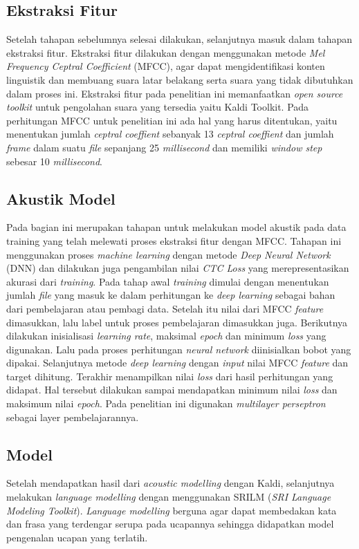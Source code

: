 \subsection{Ekstraksi Fitur}
Setelah tahapan sebelumnya selesai dilakukan, selanjutnya masuk dalam tahapan ekstraksi fitur. Ekstraksi fitur dilakukan dengan menggunakan metode \textit{Mel Frequency Ceptral Coefficient} (MFCC), agar dapat mengidentifikasi konten linguistik dan membuang suara latar belakang serta suara yang tidak dibutuhkan dalam proses ini. Ekstraksi fitur pada penelitian ini memanfaatkan \textit{open source toolkit} untuk pengolahan suara yang tersedia yaitu Kaldi Toolkit. Pada perhitungan MFCC untuk penelitian ini ada hal yang harus ditentukan, yaitu menentukan jumlah \textit{ceptral coeffient} sebanyak 13 \textit{ceptral coeffient} dan jumlah \textit{frame} dalam suatu \textit{file} sepanjang 25 \textit{millisecond} dan memiliki \textit{window step} sebesar 10 \textit{millisecond}.

\subsection{Akustik Model}
Pada bagian ini merupakan tahapan untuk melakukan model akustik pada data training yang telah melewati proses ekstraksi fitur dengan MFCC. Tahapan ini menggunakan proses \textit{machine learning} dengan metode \textit{Deep Neural Network} (DNN) dan dilakukan juga pengambilan nilai \textit{CTC Loss} yang merepresentasikan akurasi dari \textit{training}. Pada tahap awal \textit{training} dimulai dengan menentukan jumlah \textit{file} yang masuk ke dalam perhitungan ke \textit{deep learning} sebagai bahan dari pembelajaran atau pembagi data. Setelah itu nilai dari MFCC \textit{feature} dimasukkan, lalu label untuk proses pembelajaran dimasukkan juga. Berikutnya dilakukan inisialisasi \textit{learning rate}, maksimal \textit{epoch} dan minimum \textit{loss} yang digunakan. Lalu pada proses perhitungan \textit{neural network} diinisialkan bobot yang dipakai. Selanjutnya metode \textit{deep learning} dengan \textit{input} nilai MFCC \textit{feature} dan target dihitung. Terakhir menampilkan nilai \textit{loss} dari hasil perhitungan yang didapat. Hal tersebut dilakukan sampai mendapatkan minimum nilai \textit{loss} dan maksimum nilai \textit{epoch}. Pada penelitian ini digunakan \textit{multilayer perseptron} sebagai layer pembelajarannya. 

\subsection{Model}
Setelah mendapatkan hasil dari \textit{acoustic modelling} dengan Kaldi, selanjutnya melakukan \textit{language modelling} dengan menggunakan SRILM (\textit{SRI Language Modeling Toolkit}). \textit{Language modelling} berguna agar dapat membedakan kata dan frasa yang terdengar serupa pada ucapannya sehingga didapatkan model pengenalan ucapan yang terlatih. 

